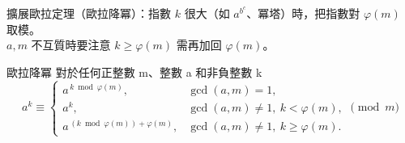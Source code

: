 擴展歐拉定理（歐拉降冪）：指數 $k$ 很大（如 $a^{b^c}$、冪塔）時，把指數對 $\varphi(m)$ 取模。\\
$a,m$ 不互質時要注意 $k\ge\varphi(m)$ 需再加回 $\varphi(m)$。\par
歐拉降冪
對於任何正整數 m、整數 a 和非負整數 k
\[
a^k \equiv
\begin{cases}
a^{\,k \bmod \varphi(m)}, & \gcd(a,m)=1,\\[6pt]
a^k, & \gcd(a,m)\ne 1,\ k < \varphi(m),\\[6pt]
a^{\,(k \bmod \varphi(m))+\varphi(m)}, & \gcd(a,m)\ne 1,\ k \ge \varphi(m).
\end{cases}
\pmod{m}
\]
